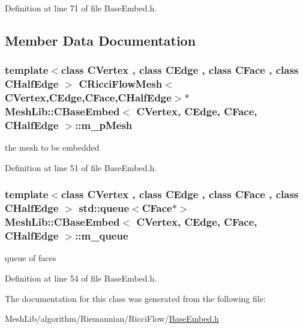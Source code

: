 Definition at line 71 of file Base\+Embed.\+h.



\subsection{Member Data Documentation}
\subsubsection[{\texorpdfstring{m\+\_\+p\+Mesh}{m_pMesh}}]{\setlength{\rightskip}{0pt plus 5cm}template$<$class C\+Vertex , class C\+Edge , class C\+Face , class C\+Half\+Edge $>$ C\+Ricci\+Flow\+Mesh$<${\bf C\+Vertex},{\bf C\+Edge},{\bf C\+Face},{\bf C\+Half\+Edge}$>$$\ast$ {\bf Mesh\+Lib\+::\+C\+Base\+Embed}$<$ {\bf C\+Vertex}, {\bf C\+Edge}, {\bf C\+Face}, {\bf C\+Half\+Edge} $>$\+::m\+\_\+p\+Mesh\hspace{0.3cm}{\ttfamily [protected]}}\hypertarget{class_mesh_lib_1_1_c_base_embed_a78bc5d476b39b3b3cb0d627de477d2f4}{}\label{class_mesh_lib_1_1_c_base_embed_a78bc5d476b39b3b3cb0d627de477d2f4}
the mesh to be embedded 

Definition at line 51 of file Base\+Embed.\+h.

\subsubsection[{\texorpdfstring{m\+\_\+queue}{m_queue}}]{\setlength{\rightskip}{0pt plus 5cm}template$<$class C\+Vertex , class C\+Edge , class C\+Face , class C\+Half\+Edge $>$ std\+::queue$<${\bf C\+Face}$\ast$$>$ {\bf Mesh\+Lib\+::\+C\+Base\+Embed}$<$ {\bf C\+Vertex}, {\bf C\+Edge}, {\bf C\+Face}, {\bf C\+Half\+Edge} $>$\+::m\+\_\+queue\hspace{0.3cm}{\ttfamily [protected]}}\hypertarget{class_mesh_lib_1_1_c_base_embed_a3ab9dc6044ded5990cd90643b99d8298}{}\label{class_mesh_lib_1_1_c_base_embed_a3ab9dc6044ded5990cd90643b99d8298}
queue of faces 

Definition at line 54 of file Base\+Embed.\+h.



The documentation for this class was generated from the following file\+:\begin{DoxyCompactItemize}
\item 
Mesh\+Lib/algorithm/\+Riemannian/\+Ricci\+Flow/\hyperlink{_base_embed_8h}{Base\+Embed.\+h}\end{DoxyCompactItemize}
